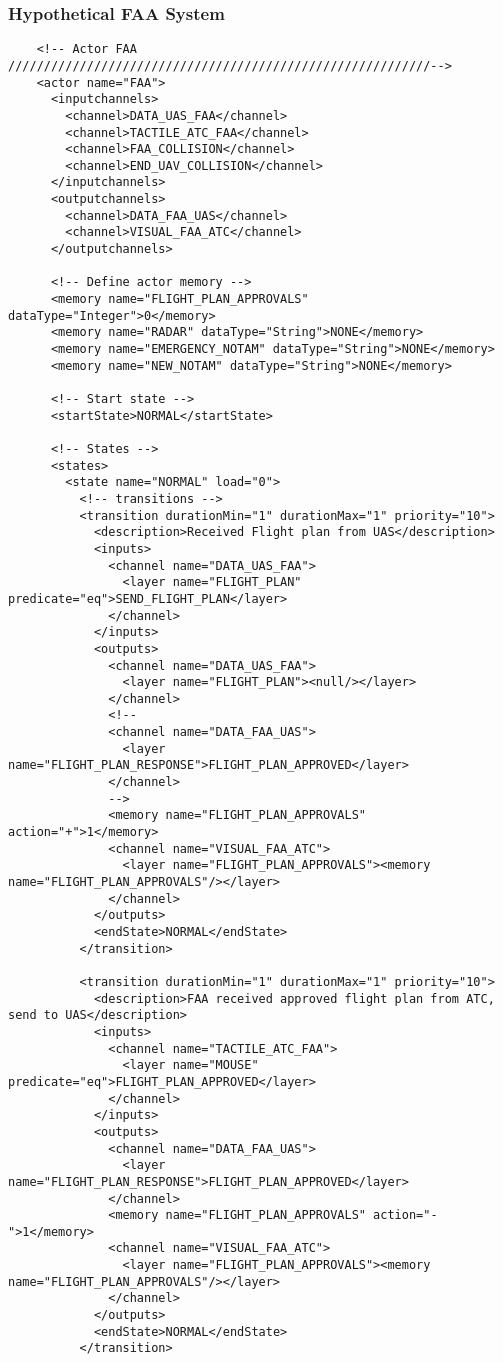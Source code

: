 \subsubsection{Hypothetical FAA System} 
\begin{verbatim}    
    <!-- Actor FAA ///////////////////////////////////////////////////////////-->
    <actor name="FAA">
      <inputchannels>
        <channel>DATA_UAS_FAA</channel>
        <channel>TACTILE_ATC_FAA</channel>
        <channel>FAA_COLLISION</channel>
        <channel>END_UAV_COLLISION</channel>
      </inputchannels>
      <outputchannels>
        <channel>DATA_FAA_UAS</channel>
        <channel>VISUAL_FAA_ATC</channel>
      </outputchannels>
      
      <!-- Define actor memory -->
      <memory name="FLIGHT_PLAN_APPROVALS" dataType="Integer">0</memory>
      <memory name="RADAR" dataType="String">NONE</memory>
      <memory name="EMERGENCY_NOTAM" dataType="String">NONE</memory>
      <memory name="NEW_NOTAM" dataType="String">NONE</memory>
      
      <!-- Start state -->
      <startState>NORMAL</startState>
      
      <!-- States -->
      <states>
        <state name="NORMAL" load="0">
          <!-- transitions -->
          <transition durationMin="1" durationMax="1" priority="10">
            <description>Received Flight plan from UAS</description>
            <inputs>
              <channel name="DATA_UAS_FAA">
                <layer name="FLIGHT_PLAN" predicate="eq">SEND_FLIGHT_PLAN</layer>
              </channel>
            </inputs>
            <outputs>
              <channel name="DATA_UAS_FAA">
                <layer name="FLIGHT_PLAN"><null/></layer>
              </channel>
              <!--
              <channel name="DATA_FAA_UAS">
                <layer name="FLIGHT_PLAN_RESPONSE">FLIGHT_PLAN_APPROVED</layer>
              </channel>
              -->
              <memory name="FLIGHT_PLAN_APPROVALS" action="+">1</memory>
              <channel name="VISUAL_FAA_ATC">
                <layer name="FLIGHT_PLAN_APPROVALS"><memory name="FLIGHT_PLAN_APPROVALS"/></layer>
              </channel>
            </outputs>
            <endState>NORMAL</endState>
          </transition>
          
          <transition durationMin="1" durationMax="1" priority="10">
            <description>FAA received approved flight plan from ATC, send to UAS</description>
            <inputs>
              <channel name="TACTILE_ATC_FAA">
                <layer name="MOUSE" predicate="eq">FLIGHT_PLAN_APPROVED</layer>
              </channel>
            </inputs>
            <outputs>
              <channel name="DATA_FAA_UAS">
                <layer name="FLIGHT_PLAN_RESPONSE">FLIGHT_PLAN_APPROVED</layer>
              </channel>
              <memory name="FLIGHT_PLAN_APPROVALS" action="-">1</memory>
              <channel name="VISUAL_FAA_ATC">
                <layer name="FLIGHT_PLAN_APPROVALS"><memory name="FLIGHT_PLAN_APPROVALS"/></layer>
              </channel>
            </outputs>
            <endState>NORMAL</endState>
          </transition>
          

\end{verbatim}
